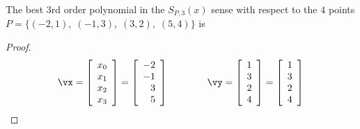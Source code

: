 \begin{example}
\label{ex:ls}
The best 3rd order polynomial in the  $S_{P,3}(x)$ sense
with respect to the $4$ points\\
$P=\{(-2,1),\; (-1,3),\; (3,2),\; (5,4)\}$ is
\end{example}
\begin{proof}
\[
  \vx
    =
    \left[\begin{array}{l}
       x_0  \\
       x_1  \\
       x_2  \\
       x_3  
    \end{array}\right] 
    =
    \left[\begin{array}{r}
       -2   \\
       -1   \\
        3   \\
        5   
    \end{array}\right] 
   \qquad\qquad
   \vy 
     =
     \left[\begin{array}{r}
         1   \\
         3   \\
         2   \\
         4   \\
     \end{array}\right] 
     =
     \left[\begin{array}{l}
         1   \\
         3   \\
         2   \\
         4   \\
     \end{array}\right] 
\]


\end{proof}
